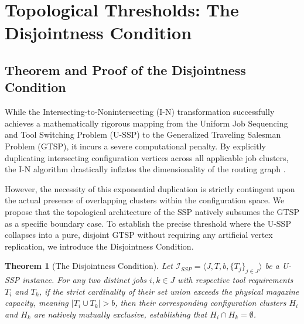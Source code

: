 \documentclass[11pt, a4paper]{book}
\newtheorem{theorem}{Theorem}[chapter]
\begin{document}
	
	\section{Topological Thresholds: The Disjointness Condition}
	
	\subsection{Theorem and Proof of the Disjointness Condition}
	
	While the Intersecting-to-Nonintersecting (I-N) transformation successfully achieves a mathematically rigorous mapping from the Uniform Job Sequencing and Tool Switching Problem (U-SSP) to the Generalized Traveling Salesman Problem (GTSP), it incurs a severe computational penalty. By explicitly duplicating intersecting configuration vertices across all applicable job clusters, the I-N algorithm drastically inflates the dimensionality of the routing graph %
	. 
	
	However, the necessity of this exponential duplication is strictly contingent upon the actual presence of overlapping clusters within the configuration space. We propose that the topological architecture of the SSP natively subsumes the GTSP as a specific boundary case. To establish the precise threshold where the U-SSP collapses into a pure, disjoint GTSP without requiring any artificial vertex replication, we introduce the Disjointness Condition.
	
	\begin{theorem}[The Disjointness Condition]
		Let $\mathcal{I}_{SSP} = \langle J, T, b, \{T_j\}_{j \in J} \rangle$ be a U-SSP instance. For any two distinct jobs $i, k \in J$ with respective tool requirements $T_i$ and $T_k$, if the strict cardinality of their set union exceeds the physical magazine capacity, meaning $|T_i \cup T_k| > b$, then their corresponding configuration clusters $H_i$ and $H_k$ are natively mutually exclusive, establishing that $H_i \cap H_k = \emptyset$. %
	\end{theorem}
	
\end{document}
